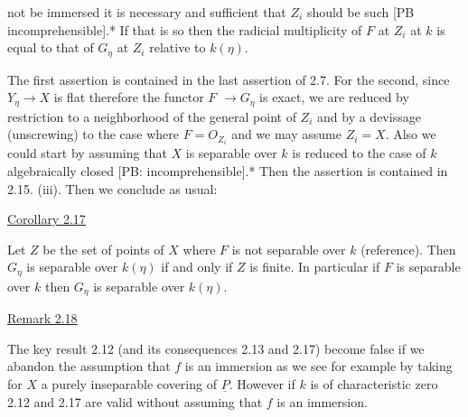 
not be immersed it is necessary and sufficient that $Z_i$ should be
such [PB incomprehensible].* If that is so then the radicial
multiplicity of $F$ at $Z_i$ at $k$ is equal to that of $G_\eta$ at $Z_i$ relative
to $k(\eta)$.

The first assertion is contained in the last assertion of
2.7. For the second, since $Y_\eta \rightarrow X$ is flat therefore the functor $F$
$\rightarrow G_\eta$ is exact, we are reduced by restriction to a neighborhood of
the general point of $Z_i$ and by a devissage (unscrewing) to the case
where $F = O_{Z_i}$ and we may assume $Z_i = X$. Also we could start by
assuming that $X$ is separable over $k$ is reduced to the case of $k$
algebraically closed [PB: incomprehensible].* Then the assertion
is contained in 2.15. (iii). Then we conclude as usual:

\uline{Corollary 2.17}

Let $Z$ be the set of points of $X$ where $F$ is not separable over
$k$ (reference). Then $G_\eta$ is separable over $k(\eta)$ if and only if $Z$ is
finite. In particular if $F$ is separable over $k$ then $G_\eta$ is
separable over $k(\eta)$.

\uline{Remark 2.18}

The key result 2.12 (and its consequences 2.13 and 2.17)
become false if we abandon the assumption that $f$ is an immersion
as we see for example by taking for $X$ a purely inseparable
covering of $\underline{P}$. However if $k$ is of characteristic zero 2.12 and
2.17 are valid without assuming that $f$ is an immersion.
